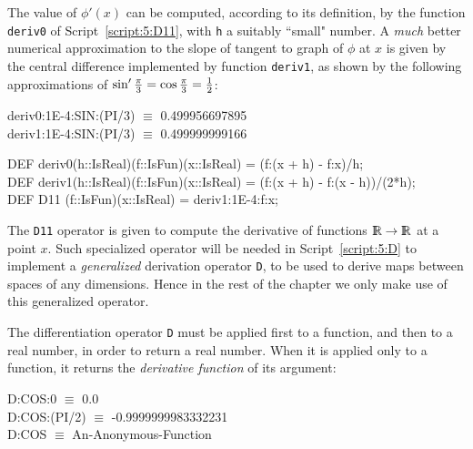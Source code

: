 \documentclass{31x47jw}
\begin{document}
The value of $\phi'(x)$ can be computed, according to its definition, by
the function \texttt{deriv0} of Script~\ref{script:5:D11}, with
\texttt{h}  a suitably ``small" number.  A \emph{much} better numerical
approximation to the slope of tangent to graph of $\phi$ at $x$ is given
by the central difference implemented by function \texttt{deriv1}, as
shown by the following approximations of $\sin' {\pi\over 3}=\cos
{\pi\over 3}={1\over 2}$:
\begin{smallplasm}
deriv0:1E-4:SIN:(PI/3)  $\equiv$ 0.499956697895\\
deriv1:1E-4:SIN:(PI/3)  $\equiv$ 0.499999999166
\end{smallplasm}

\begin{script}
\begin{smallplasm}
DEF deriv0(h::IsReal)(f::IsFun)(x::IsReal) = %
    (f:(x + h) - f:x)/h;\\%
    
DEF deriv1(h::IsReal)(f::IsFun)(x::IsReal) = %
    (f:(x + h) - f:(x - h))/(2*h);\\[0.3cm]
    
DEF D11 (f::IsFun)(x::IsReal) = deriv1:1E-4:f:x;
\end{smallplasm}
\label{script:5:D11}
\end{script}

The \texttt{D11} operator is given to compute the derivative of 
functions $\mathbb{I\!\!R}\rightarrow\mathbb{I\!\!R}$ at a point $x$.  Such specialized
operator will be needed in Script~\ref{script:5:D} to implement a
\emph{generalized} derivation operator \texttt{D}, to be used to
derive maps between spaces of any dimensions.  Hence in the
rest of the chapter we only make use of this generalized operator.

The differentiation operator \texttt{D} must be applied first to a
function, and then to a real number, in order to return a real number. 
When it is applied only to a function, it returns the \emph{derivative
function} of its argument:

\begin{smallplasm}
D:COS:0 $\equiv$ 0.0 \\
D:COS:(PI/2) $\equiv$ -0.9999999983332231\\
D:COS $\equiv$ An-Anonymous-Function
\end{smallplasm}
\end{document}
